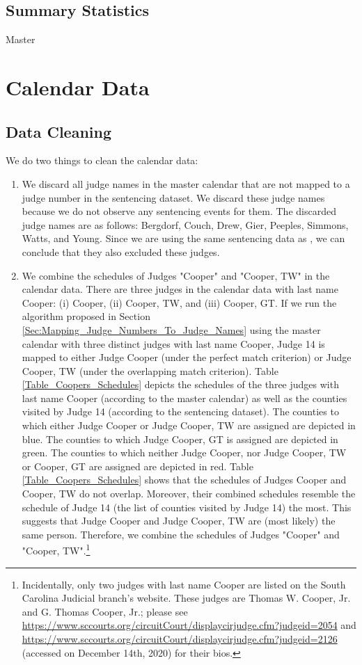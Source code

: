 \documentclass[11pt]{article}
\theoremstyle{ModifiedStyle}
\begin{document}
  \subsection{Summary Statistics}
Master
\section{Calendar Data}
  \subsection{Data Cleaning}
    We do two things to clean the calendar data:

    \begin{enumerate}
      \item We discard all judge names in the master calendar that are not mapped to a judge number in the sentencing dataset. We discard these judge names because we do not observe any sentencing events for them. The discarded judge names are as follows: Bergdorf, Couch, Drew, Gier, Peeples, Simmons, Watts, and Young. Since we are using the same sentencing data as \cite{hester2017conditional}, we can conclude that they also excluded these judges.
    	\item We combine the schedules of Judges "Cooper" and "Cooper, TW" in the calendar data. There are three judges in the calendar data with last name Cooper: (i) Cooper, (ii) Cooper, TW, and (iii) Cooper, GT. If we run the algorithm proposed in Section \ref{Sec:Mapping_Judge_Numbers_To_Judge_Names} using the master calendar with three distinct judges with last name Cooper, Judge 14 is mapped to either Judge Cooper (under the perfect match criterion) or Judge Cooper, TW (under the overlapping match criterion). Table \ref{Table_Coopers_Schedules} depicts the schedules of the three judges with last name Cooper (according to the master calendar) as well as the counties visited by Judge 14 (according to the sentencing dataset). The counties to which either Judge Cooper or Judge Cooper, TW are assigned are depicted in blue. The counties to which Judge Cooper, GT is assigned are depicted in green. The counties to which neither Judge Cooper, nor Judge Cooper, TW or Cooper, GT are assigned are depicted in red. Table \ref{Table_Coopers_Schedules} shows that the schedules of Judges Cooper and Cooper, TW do not overlap. Moreover, their combined schedules resemble the schedule of Judge 14 (the list of counties visited by Judge 14) the most. This suggests that Judge Cooper and Judge Cooper, TW are (most likely) the same person. Therefore, we combine the schedules of Judges "Cooper" and "Cooper, TW".\footnote{Incidentally, only two judges with last name Cooper are listed on the South Carolina Judicial branch's website. These judges are Thomas W. Cooper, Jr. and G. Thomas Cooper, Jr.; please see \url{https://www.sccourts.org/circuitCourt/displaycirjudge.cfm?judgeid=2054} and \url{https://www.sccourts.org/circuitCourt/displaycirjudge.cfm?judgeid=2126} (accessed on December 14th, 2020) for their bios.}
    \end{enumerate}
\end{document}

